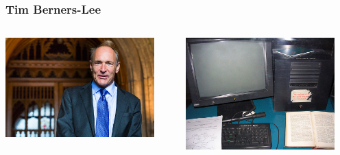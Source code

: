 \documentclass[14pt]{beamer}
\begin{document}
\begin{frame}
	\frametitle{Tim Berners-Lee}
	\begin{center}
		\begin{columns}
			\begin{column}{0.5\textwidth}
		\includegraphics[width=0.9\textwidth]{tim_berners_lee.jpg}
			\end{column}
			\begin{column}{0.5\textwidth}
		\includegraphics[width=0.9\textwidth]{tim_berners_lee_setup.jpg}
			\end{column}
		\end{columns}
		\vspace*{1em}
	\end{center}
\end{frame}
\end{document}

